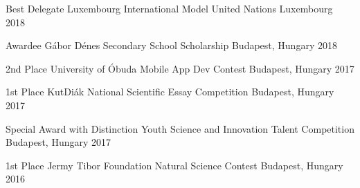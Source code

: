 

\cvsubsection{}


\begin{cvhonors}

  \cvhonor
  	{Best Delegate}
    {Luxembourg International Model United Nations}
    {Luxembourg}
    {2018}
  
  \cvhonor
    {Awardee} %
    {Gábor Dénes Secondary School Scholarship} %
    {Budapest, Hungary} %
    {2018} %
  
   \cvhonor
    {2nd Place} %
    {University of Óbuda Mobile App Dev Contest} %
    {Budapest, Hungary} %
    {2017} %
    
     \cvhonor
    {1st Place} %
    {KutDiák National Scientific Essay Competition} %
    {Budapest, Hungary} %
    {2017} %
    
    \cvhonor
    {Special Award with Distinction} %
    {Youth Science and Innovation Talent Competition} %
    {Budapest, Hungary} %
    {2017} %

    
  \cvhonor
    {1st Place} %
    {Jermy Tibor Foundation Natural Science Contest} %
    {Budapest, Hungary} %
    {2016} %

  
 

 
    
   

\end{cvhonors}



